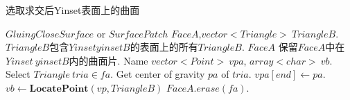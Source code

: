 \documentclass[a4paper]{book}
\renewcommand{\algorithmicrequire}{\textbf{输入:}}
\renewcommand{\algorithmicensure}{\textbf{输出:}}
\renewcommand{\algorithmicrequire}{\textbf{Input : }}
\renewcommand{\algorithmicrequire}{\textbf{Precondition : }}
\renewcommand{\algorithmicensure}{\textbf{Output : }}
\renewcommand{\algorithmicensure}{\textbf{Postcondition : }}
\numberwithin{equation}{chapter}
\theoremstyle{definition}
\begin{document}
\begin{algorithm}
	\caption{选取求交后Yinset表面上的曲面}
	\begin{algorithmic}[1]
		\renewcommand{\algorithmicrequire}{\textbf{Input : }}
		\Require $GluingCloseSurface$ or $SurfacePatch$ $FaceA$,$vector<Triangle>\ TriangleB$.
		\renewcommand{\algorithmicrequire}{\textbf{Precondition : }}
		\Require $TriangleB$包含$Yinset yinsetB$的表面上的所有$TriangleB$.
		\renewcommand{\algorithmicensure}{\textbf{Output : }}
		\Ensure $FaceA$
		\renewcommand{\algorithmicensure}{\textbf{Postcondition : }}
		\Ensure 保留$FaceA$中在$Yinset\ yinsetB$内的曲面片.
		\State Name $vector<Point>\ vpa$, $array<char>\ vb$.
		\State Select $Triangle\ tria \in fa$.
		\State Get  center of gravity $pa$ of $tria$.
		\State $vpa[end] \gets pa$.
		\EndFor
		\State $vb \gets \textbf{LocatePoint}(vp,TriangleB)$
		\State $FaceA.erase(fa)$.
		\EndIf
		\EndFor
		\EndFunction
	\end{algorithmic}
\end{algorithm}
\end{document}

